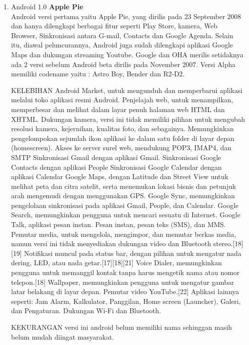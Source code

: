 \begin{enumerate}

\item Android 1.0 \textbf{Apple Pie}\\
Android versi pertama yaitu Apple Pie, yang dirilis pada 23 September 2008 dan hanya dilengkapi berbagai fitur seperti Play Store, kamera, Web Browser, Sinkronisasi antara G-mail, Contacts dan Google Agenda. Selain itu, diawal peluncurannya, Android juga sudah dilengkapi aplikasi Google Maps dan dukungan streaming Youtube. Google dan OHA merilis setidaknya ada 2 versi sebelum Android beta dirilis pada November 2007. Versi Alpha memiliki codename yaitu : Astro Boy, Bender dan R2-D2.

KELEBIHAN
Android Market, untuk mengunduh dan memperbarui aplikasi melalui toko aplikasi resmi Android.
Penjelajah web, untuk menampilkan, memperbesar dan melihat dalam layar penuh halaman web HTML dan XHTML.
Dukungan kamera, versi ini tidak memiliki pilihan untuk mengubah resolusi kamera, kejernihan, kualitas foto, dan sebagainya.
Memungkinkan pengelompokan sejumlah ikon aplikasi ke dalam satu folder di layar depan (homescreen).
Akses ke server surel web, mendukung POP3, IMAP4, dan SMTP
Sinkronisasi Gmail dengan aplikasi Gmail.
Sinkronisasi Google Contacts dengan aplikasi People
Sinkronisasi Google Calendar dengan aplikasi Calendar
Google Maps, dengan Latitude dan Street View untuk melihat peta dan citra satelit, serta menemukan lokasi bisnis dan petunjuk arah mengemudi dengan menggunakan GPS.
Google Sync, memungkinkan pengelolaan sinkronisasi pada aplikasi Gmail, People, dan Calendar.
Google Search, memungkinkan pengguna untuk mencari sesuatu di Internet.
Google Talk, aplikasi pesan instan.
Pesan instan, pesan teks (SMS), dan MMS.
Pemutar media, untuk mengelola, mengimpor, dan memutar berkas media, namun versi ini tidak menyediakan dukungan video dan Bluetooth stereo.[18][19]
Notifikasi muncul pada status bar, dengan pilihan untuk mengatur nada dering, LED, atau nada getar.[17][18][21]
Voice Dialer, memungkinkan pengguna untuk memanggil kontak tanpa harus mengetik nama atau nomor telepon.[18]
Wallpaper, memungkinkan pengguna untuk mengatur gambar latar belakang di layar depan.
Pemutar video YouTube.[22]
Aplikasi lainnya seperti: Jam Alarm, Kalkulator, Panggilan, Home screen (Launcher), Galeri, dan Pengaturan.
Dukungan Wi-Fi dan Bluetooth.

KEKURANGAN
versi ini android belum memiliki nama sehinggan masih belum mudah diingat masyarakat.



\end{enumerate}
